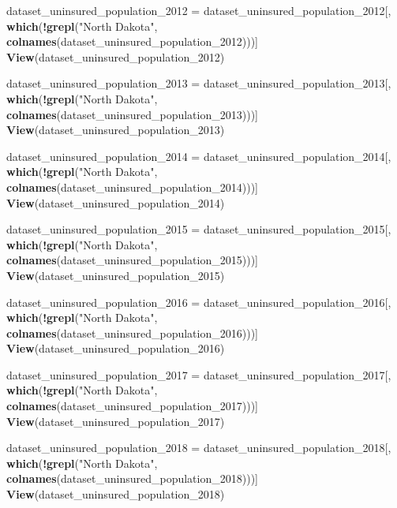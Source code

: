 \documentclass[
]{article}
\newenvironment{Shaded}{\begin{snugshade}}{\end{snugshade}}
\newcommand{\FunctionTok}[1]{\textcolor[rgb]{0.13,0.29,0.53}{\textbf{#1}}}
\newcommand{\NormalTok}[1]{#1}
\newcommand{\OtherTok}[1]{\textcolor[rgb]{0.56,0.35,0.01}{#1}}
\newcommand{\SpecialCharTok}[1]{\textcolor[rgb]{0.81,0.36,0.00}{\textbf{#1}}}
\newcommand{\StringTok}[1]{\textcolor[rgb]{0.31,0.60,0.02}{#1}}
\begin{document}
\begin{Shaded}
\begin{Highlighting}[]
\NormalTok{dataset\_uninsured\_population\_2012 }\OtherTok{=}\NormalTok{ dataset\_uninsured\_population\_2012[, }\FunctionTok{which}\NormalTok{(}\SpecialCharTok{!}\FunctionTok{grepl}\NormalTok{(}\StringTok{"North Dakota"}\NormalTok{, }\FunctionTok{colnames}\NormalTok{(dataset\_uninsured\_population\_2012)))]}
\FunctionTok{View}\NormalTok{(dataset\_uninsured\_population\_2012)}

\NormalTok{dataset\_uninsured\_population\_2013 }\OtherTok{=}\NormalTok{ dataset\_uninsured\_population\_2013[, }\FunctionTok{which}\NormalTok{(}\SpecialCharTok{!}\FunctionTok{grepl}\NormalTok{(}\StringTok{"North Dakota"}\NormalTok{, }\FunctionTok{colnames}\NormalTok{(dataset\_uninsured\_population\_2013)))]}
\FunctionTok{View}\NormalTok{(dataset\_uninsured\_population\_2013)}

\NormalTok{dataset\_uninsured\_population\_2014 }\OtherTok{=}\NormalTok{ dataset\_uninsured\_population\_2014[, }\FunctionTok{which}\NormalTok{(}\SpecialCharTok{!}\FunctionTok{grepl}\NormalTok{(}\StringTok{"North Dakota"}\NormalTok{, }\FunctionTok{colnames}\NormalTok{(dataset\_uninsured\_population\_2014)))]}
\FunctionTok{View}\NormalTok{(dataset\_uninsured\_population\_2014)}

\NormalTok{dataset\_uninsured\_population\_2015 }\OtherTok{=}\NormalTok{ dataset\_uninsured\_population\_2015[, }\FunctionTok{which}\NormalTok{(}\SpecialCharTok{!}\FunctionTok{grepl}\NormalTok{(}\StringTok{"North Dakota"}\NormalTok{, }\FunctionTok{colnames}\NormalTok{(dataset\_uninsured\_population\_2015)))]}
\FunctionTok{View}\NormalTok{(dataset\_uninsured\_population\_2015)}

\NormalTok{dataset\_uninsured\_population\_2016 }\OtherTok{=}\NormalTok{ dataset\_uninsured\_population\_2016[, }\FunctionTok{which}\NormalTok{(}\SpecialCharTok{!}\FunctionTok{grepl}\NormalTok{(}\StringTok{"North Dakota"}\NormalTok{, }\FunctionTok{colnames}\NormalTok{(dataset\_uninsured\_population\_2016)))]}
\FunctionTok{View}\NormalTok{(dataset\_uninsured\_population\_2016)}

\NormalTok{dataset\_uninsured\_population\_2017 }\OtherTok{=}\NormalTok{ dataset\_uninsured\_population\_2017[, }\FunctionTok{which}\NormalTok{(}\SpecialCharTok{!}\FunctionTok{grepl}\NormalTok{(}\StringTok{"North Dakota"}\NormalTok{, }\FunctionTok{colnames}\NormalTok{(dataset\_uninsured\_population\_2017)))]}
\FunctionTok{View}\NormalTok{(dataset\_uninsured\_population\_2017)}

\NormalTok{dataset\_uninsured\_population\_2018 }\OtherTok{=}\NormalTok{ dataset\_uninsured\_population\_2018[, }\FunctionTok{which}\NormalTok{(}\SpecialCharTok{!}\FunctionTok{grepl}\NormalTok{(}\StringTok{"North Dakota"}\NormalTok{, }\FunctionTok{colnames}\NormalTok{(dataset\_uninsured\_population\_2018)))]}
\FunctionTok{View}\NormalTok{(dataset\_uninsured\_population\_2018)}


\end{Highlighting}
\end{Shaded}
\end{document}
